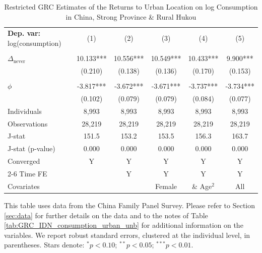 \begin{table}[htbp] \centering \begin{threeparttable}
 \caption{Restricted GRC Estimates of the Returns to Urban Location on log Consumption in China, Strong Province & Rural Hukou} 
 \label{tab:GRC_CHN_s_rur_consumption_urban_unb} 
\begin{tabular}{l ccccc} \toprule  \textbf{Dep. var:}  log(consumption) 
                    &\multicolumn{1}{c}{(1)}   &\multicolumn{1}{c}{(2)}   &\multicolumn{1}{c}{(3)}   &\multicolumn{1}{c}{(4)}   &\multicolumn{1}{c}{(5)}   \\
                    &               &               &               &               &               \\
\addlinespace
$\Delta_{\text{never}}$&      10.133***&      10.556***&      10.549***&      10.433***&       9.900***\\
                    &     (0.210)   &     (0.138)   &     (0.136)   &     (0.170)   &     (0.153)   \\
                    &               &               &               &               &               \\
\addlinespace
$\phi$              &      -3.817***&      -3.672***&      -3.671***&      -3.737***&      -3.734***\\
                    &     (0.102)   &     (0.079)   &     (0.079)   &     (0.084)   &     (0.077)   \\
\addlinespace
Individuals         &       8,993   &       8,993   &       8,993   &       8,993   &       8,993   \\
Observations        &      28,219   &      28,219   &      28,219   &      28,219   &      28,219   \\
J-stat              &       151.5   &       153.2   &       153.5   &       156.3   &       163.7   \\
J-stat (p-value)    &       0.000   &       0.000   &       0.000   &       0.000   &       0.000   \\
Converged           &           Y   &           Y   &           Y   &           Y   &           Y   \\
\cmidrule{2-6} Time FE & & Y & Y & Y & Y \\ Covariates & & & Female & \& Age$^2$ & All \\ \bottomrule \end{tabular} \begin{tablenotes}[flushleft] \footnotesize \item{This table uses data from the China Family Panel Survey. Please refer to Section \ref{sec:data} for further details on the data and to the notes of Table \ref{tab:GRC_IDN_consumption_urban_unb} for additional information on the variables. We report robust standard errors, clustered at the individual level, in parentheses. Stars denote: $^{*} p<0.10$; $^{**} p<0.05$; $^{***} p<0.01$.} \end{tablenotes} \end{threeparttable} \end{table}
